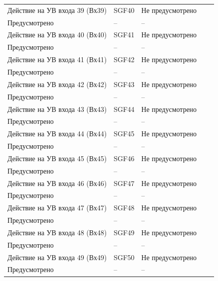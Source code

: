 \begin{longtable}{|>{\centering\arraybackslash}m{5.3cm}|>{\centering\arraybackslash}m{3.3cm}|>{\centering\arraybackslash}m{4.2cm}|>{\centering\arraybackslash}m{1.8cm}|>{\centering\arraybackslash}m{1cm}|}
\hline
\centering Действие на УВ входа 39 (Вх39)  & \centering SGF40 & \centering Не предусмотрено \\ Предусмотрено & \centering -- & \centering \arraybackslash -- \\
\hline
\centering Действие на УВ входа 40 (Вх40)  & \centering SGF41 & \centering Не предусмотрено \\ Предусмотрено & \centering -- & \centering \arraybackslash -- \\
\hline
\centering Действие на УВ входа 41 (Вх41)  & \centering SGF42 & \centering Не предусмотрено \\ Предусмотрено & \centering -- & \centering \arraybackslash -- \\
\hline
\centering Действие на УВ входа 42 (Вх42)  & \centering SGF43 & \centering Не предусмотрено \\ Предусмотрено & \centering -- & \centering \arraybackslash -- \\
\hline
\centering Действие на УВ входа 43 (Вх43)  & \centering SGF44 & \centering Не предусмотрено \\ Предусмотрено & \centering -- & \centering \arraybackslash -- \\
\hline
\centering Действие на УВ входа 44 (Вх44)  & \centering SGF45 & \centering Не предусмотрено \\ Предусмотрено & \centering -- & \centering \arraybackslash -- \\
\hline
\centering Действие на УВ входа 45 (Вх45)  & \centering SGF46 & \centering Не предусмотрено \\ Предусмотрено & \centering -- & \centering \arraybackslash -- \\
\hline
\centering Действие на УВ входа 46 (Вх46)  & \centering SGF47 & \centering Не предусмотрено \\ Предусмотрено & \centering -- & \centering \arraybackslash -- \\
\hline
\centering Действие на УВ входа 47 (Вх47)  & \centering SGF48 & \centering Не предусмотрено \\ Предусмотрено & \centering -- & \centering \arraybackslash -- \\
\hline
\centering Действие на УВ входа 48 (Вх48)  & \centering SGF49 & \centering Не предусмотрено \\ Предусмотрено & \centering -- & \centering \arraybackslash -- \\
\hline
\centering Действие на УВ входа 49 (Вх49)  & \centering SGF50 & \centering Не предусмотрено \\ Предусмотрено & \centering -- & \centering \arraybackslash -- \\

\end{longtable}
